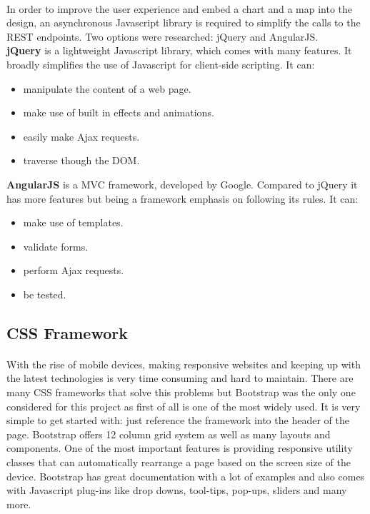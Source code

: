 \documentclass{l4proj}
\begin{document}
\paragraph{}
In order to improve the user experience and embed a chart and a map into the design, an asynchronous Javascript library is required to simplify the calls to the REST endpoints. Two options were researched: jQuery and AngularJS.
\\\hspace*{7mm}\textbf{jQuery} is a lightweight Javascript library, which comes with many features. It broadly simplifies the use of Javascript for client-side scripting. It can:
\begin{multicols}{2}
	\begin{itemize}
		\item manipulate the content of a web page.
		\item make use of built in effects and animations.
		\item easily make Ajax requests.
		\item traverse though the DOM.
	\end{itemize} 
\end{multicols}
\textbf{AngularJS} is a MVC framework, developed by Google. Compared to jQuery it has more features but being a framework emphasis on following its rules. It can:
\begin{multicols}{2}
	\begin{itemize}
		\item make use of templates.
		\item validate forms.
		\item perform Ajax requests.
		\item be tested.
	\end{itemize} 
\end{multicols}

\subsection{CSS Framework}
\paragraph{}
With the rise of mobile devices, making responsive websites and keeping up with the latest technologies is very time consuming and hard to maintain. There are many CSS frameworks that solve this problems but Bootstrap was the only one considered for this project as first of all is one of the most widely used. It is very simple to get started with: just reference the framework into the header of the page. Bootstrap offers 12 column grid system as well as many layouts and components. One of the most important features is providing responsive utility classes that can automatically rearrange a page based on the screen size of the device. Bootstrap has great documentation with a lot of examples and also comes with Javascript plug-ins like drop downs, tool-tips, pop-ups, sliders and many more.   
\end{document}
